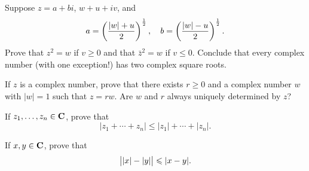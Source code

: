 \begin{prbm}
Suppose $z=a+bi$, $w+u+iv$, and
\[a=\left(\frac{|w|+u}{2}\right)^\frac{1}{2},\quad b=\left(\frac{|w|-u}{2}\right)^\frac{1}{2}.\]
Prove that $z^2=w$ if $v\ge0$ and that $\bar{z}^2=w$ if $v\le0$. Conclude that every complex number (with one exception!) has two complex square roots.
\end{prbm}

\begin{prbm}
If $z$ is a complex number, prove that there exists $r\ge0$ and a complex number $w$ with $|w|=1$ such that $z=rw$. Are $w$ and $r$ always uniquely determined by $z$?
\end{prbm}

\begin{prbm}
If $z_1,\dots,z_n\in\mathbf C$, prove that
\[|z_1+\cdots+z_n|\le|z_1|+\cdots+|z_n|.\]
\end{prbm}

\begin{prbm}
If $x,y\in\mathbf C$, prove that
\[\left||x|-|y|\right|\leqslant|x-y|.\]
\end{prbm}
